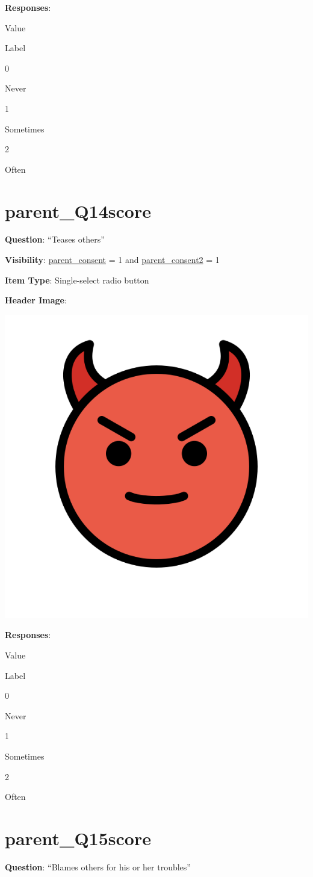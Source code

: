 \documentclass[]{book}
\begin{document}
\textbf{Responses}:

Value

Label

0

Never

1

Sometimes

2

Often

\hypertarget{parent_q14score}{%
\section{parent\_Q14score}\label{parent_q14score}}

\textbf{Question}: ``Teases others''

\textbf{Visibility}: \protect\hyperlink{parent_consent}{parent\_consent} = 1 and \protect\hyperlink{parent_consent2}{parent\_consent2} = 1

\textbf{Item Type}: Single-select radio button

\textbf{Header Image}:

\begin{flushleft}\includegraphics[width=0.33\linewidth]{downloadFigs4latex_HBN_PMHS_Codebook/parent_Q14score_headerImg} \end{flushleft}

\textbf{Responses}:

Value

Label

0

Never

1

Sometimes

2

Often

\hypertarget{parent_q15score}{%
\section{parent\_Q15score}\label{parent_q15score}}

\textbf{Question}: ``Blames others for his or her troubles''
\end{document}

